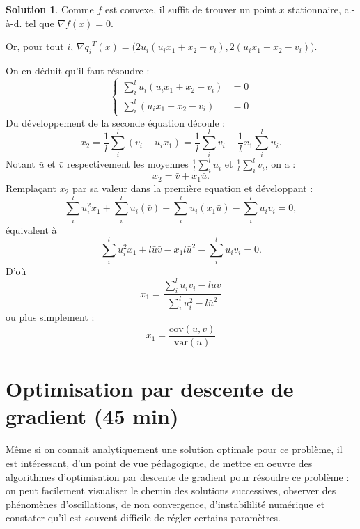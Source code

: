 \documentclass[a4paper,francais]{article}
\newcommand{\cad}{c.-à-d.}
\theoremstyle{definition}
\newtheorem*{solution}{Solution}
\begin{document}
\begin{solution}
  Comme $f$ est convexe, il suffit de trouver un point $x$ stationnaire,
  {\cad} tel que $\nabla f(x) = 0$.

  Or, pour tout $i$, ${\nabla q_i}^T(x) = \big( 2u_i (u_ix_1 + x_2 - v_i), 2(u_ix_1 + x_2 - v_i) \big)$.

  On en déduit qu'il faut résoudre :
  \[
  \left\{
  \begin{array}{cc}
    \sum_i^l u_i (u_ix_1 + x_2 - v_i) &= 0 \\
    \sum_i^l (u_ix_1 + x_2 - v_i) &= 0
  \end{array}
  \right.
  \]
  Du développement de la seconde équation découle :
  \[
  x_2 = \frac{1}{l} \sum_i^l (v_i - u_ix_1) = \frac{1}{l} \sum_i^l v_i - \frac{1}{l} x_1\sum_i^l u_i. 
  \]
  Notant $\bar{u}$ et $\bar{v}$ respectivement les moyennes $\frac{1}{l} \sum_i^l u_i$ et $\frac{1}{l} \sum_i^l v_i$, on a :
  \[
  x_2 = \bar{v} + x_1 \bar{u}.
  \]
  Remplaçant $x_2$ par sa valeur dans la première equation et développant :
  \[
  \sum_i^l u_i^2 x_1 + \sum_i^l u_i (\bar{v}) - \sum_i^l u_i (x_1\bar{u}) - \sum_i^l u_iv_i = 0,
  \]
  équivalent à 
  \[
  \sum_i^l u_i^2 x_1 + l\bar{u}\bar{v} - x_1 l{\bar{u}}^2  - \sum_i^l u_iv_i = 0.
  \]
  D'où
  \[
  x_1 = \frac{\sum_i^l u_iv_i - l\bar{u}\bar{v}}{\sum_i^l u_i^2 - l{\bar{u}}^2}
  \]
  ou plus simplement :
  \[
  x_1 = \frac{ \text{cov}(u,v) }{ \text{var}(u) } 
  \]
  
\end{solution}

\section{Optimisation par descente de gradient (45 min)}

Même si on connait analytiquement une solution optimale pour ce problème, il est intéressant,
d'un point de vue pédagogique, de mettre en oeuvre des algorithmes d'optimisation par descente de
gradient pour résoudre ce problème : on peut facilement visualiser le chemin des solutions successives,
observer des phénomènes d'oscillations, de non convergence, d'instabililité numérique et constater
qu'il est souvent difficile de régler certains paramètres.
\end{document}
